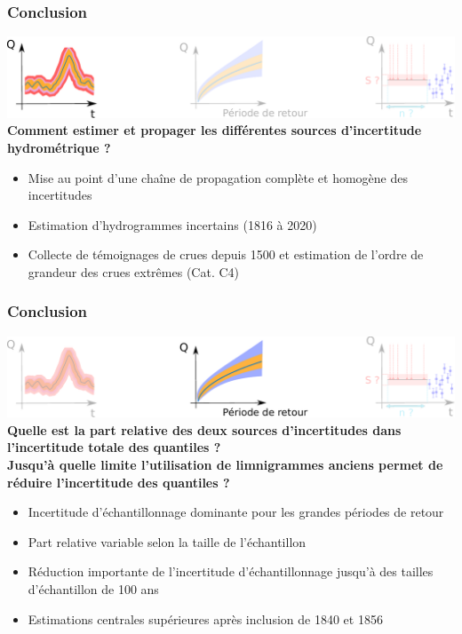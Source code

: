 \documentclass[compress,9pt]{beamer}
\begin{document}
	\begin{frame}[t]
		\frametitle{Conclusion}
		\centering
		\includegraphics[width = .95\textwidth]{./Figures/SchemaConclu1.pdf} 
		\vfill
		\textbf{Comment estimer et propager les différentes sources d'incertitude hydrométrique ?}\\
		\vfill
		\begin{itemize}
			\item<1->[$\vartriangleright$] Mise au point d'une chaîne de propagation complète et homogène des incertitudes 
			\vspace{5pt}
			\item<2->[$\vartriangleright$] Estimation d'hydrogrammes incertains (1816 à 2020)
			\vspace{5pt}			
			\item<3->[$\vartriangleright$] Collecte de témoignages de crues depuis 1500 et estimation de l'ordre de grandeur des crues extrêmes (Cat. C4)
		\end{itemize}
	\end{frame}
	
	\begin{frame}[t]
		\frametitle{Conclusion}
		\centering
		\includegraphics[width = .95\textwidth]{./Figures/SchemaConclu2.pdf} 
		\vfill
		\textbf{Quelle est la part relative des deux sources d'incertitudes dans l'incertitude totale des
quantiles ?}\\
\vspace{5pt}
		\textbf{Jusqu'à quelle limite l'utilisation de limnigrammes anciens permet de réduire l'incertitude des quantiles ?}\\
		\vfill
		\begin{itemize}
			\item<1->[$\vartriangleright$] Incertitude d'échantillonnage dominante pour les grandes périodes de retour
			\vspace{5pt}
			\item<2->[$\vartriangleright$] Part relative variable selon la taille de l'échantillon
			\vspace{5pt}
			\item<3->[$\vartriangleright$] Réduction importante de l'incertitude d'échantillonnage jusqu'à des tailles d'échantillon de 100 ans
			\vspace{5pt}
			\item<4->[$\vartriangleright$] Estimations centrales supérieures après inclusion de 1840 et 1856
		\end{itemize}
	\end{frame}
	
\end{document}
